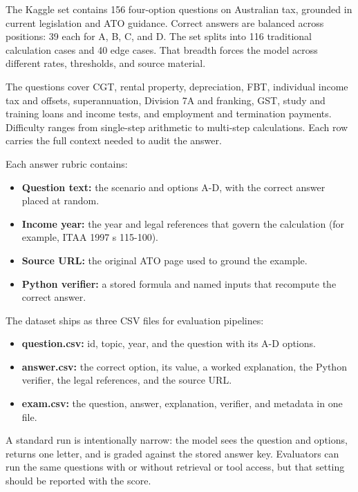 \documentclass[11pt]{article}
\begin{document}
The Kaggle set contains 156 four-option questions on Australian tax, grounded in current legislation and ATO guidance. Correct answers are balanced across positions: 39 each for A, B, C, and D. The set splits into 116 traditional calculation cases and 40 edge cases. That breadth forces the model across different rates, thresholds, and source material.

The questions cover CGT, rental property, depreciation, FBT, individual income tax and offsets, superannuation, Division 7A and franking, GST, study and training loans and income tests, and employment and termination payments. Difficulty ranges from single-step arithmetic to multi-step calculations. Each row carries the full context needed to audit the answer.

Each answer rubric contains:

\begin{itemize}
  \item \textbf{Question text:} the scenario and options A-D, with the correct answer placed at random.
  \item \textbf{Income year:} the year and legal references that govern the calculation (for example, ITAA 1997 s 115-100).
  \item \textbf{Source URL:} the original ATO page used to ground the example.
  \item \textbf{Python verifier:} a stored formula and named inputs that recompute the correct answer.
\end{itemize}

The dataset ships as three CSV files for evaluation pipelines:

\begin{itemize}
  \item \textbf{question.csv:} id, topic, year, and the question with its A-D options.
  \item \textbf{answer.csv:} the correct option, its value, a worked explanation, the Python verifier, the legal references, and the source URL.
  \item \textbf{exam.csv:} the question, answer, explanation, verifier, and metadata in one file.
\end{itemize}

A standard run is intentionally narrow: the model sees the question and options, returns one letter, and is graded against the stored answer key. Evaluators can run the same questions with or without retrieval or tool access, but that setting should be reported with the score.
\end{document}
